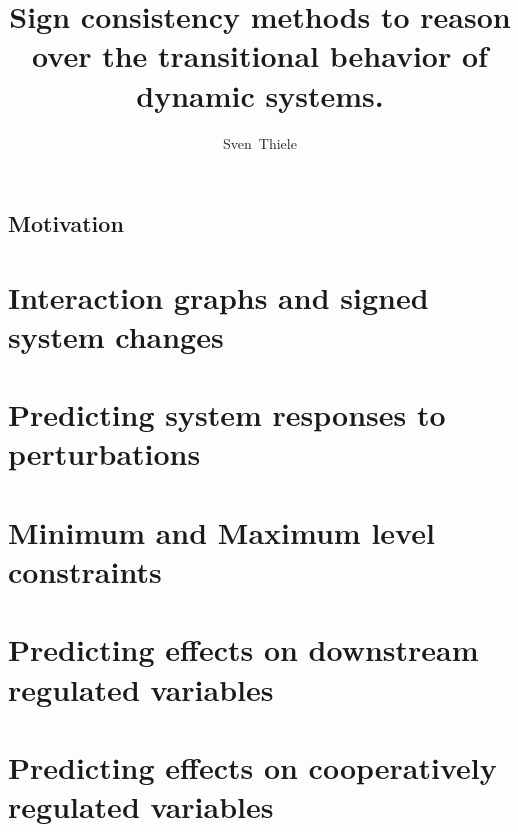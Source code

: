 \documentclass{llncs}
\begin{document}
\pagestyle{plain}

\title{Sign consistency methods to reason over the transitional behavior of dynamic systems.}
\author{
  Sven~Thiele
}
\maketitle

\section*{Motivation}


\tableofcontents

\nocite{sk06}
\nocite{saez2009}
\nocite{sthiele10b}
\nocite{sthiele11a}
\nocite{samaga13a}
\nocite{samaga13b}
\nocite{sthiele15}



 


\chapter*{Interaction graphs and signed system changes}

% 
%  

\chapter*{Predicting system responses to perturbations}


\chapter*{Minimum and Maximum level constraints}


\chapter*{Predicting effects on downstream regulated variables}


\chapter*{Predicting effects on cooperatively regulated variables}

\end{document}
